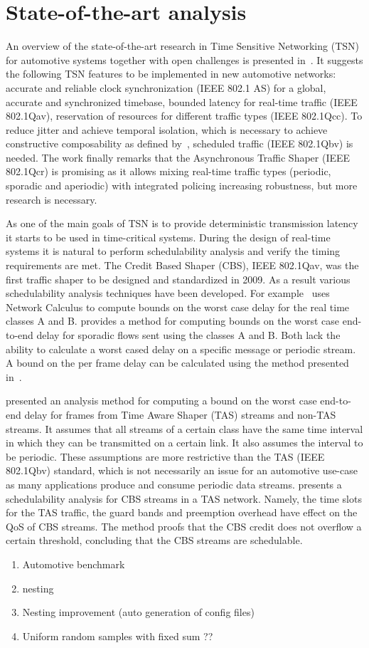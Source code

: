 \section{State-of-the-art analysis}
\label{sec:sota}
An overview of the state-of-the-art research in Time Sensitive Networking (TSN) for automotive systems together with open challenges is presented in~\cite{ashjaei2021time}. It suggests the following TSN features to be implemented in new automotive networks: accurate and reliable clock synchronization (IEEE 802.1 AS) for a global, accurate and synchronized timebase, bounded latency for real-time traffic (IEEE 802.1Qav), reservation of resources for different traffic types (IEEE 802.1Qcc). To reduce jitter and achieve temporal isolation, which is necessary to achieve constructive composability as defined by~\cite{kopetz2003time}, scheduled traffic (IEEE 802.1Qbv) is needed. The work finally remarks that the Asynchronous Traffic Shaper (IEEE 802.1Qcr) is promising as it allows mixing real-time traffic types (periodic, sporadic and aperiodic) with integrated policing increasing robustness, but more research is necessary.

As one of the main goals of TSN is to provide deterministic transmission latency it starts to be used in time-critical systems. During the design of real-time systems it is natural to perform schedulability analysis and verify the timing requirements are met. The Credit Based Shaper (CBS), IEEE 802.1Qav, was the first traffic shaper to be designed and standardized in 2009. As a result various schedulability analysis techniques have been developed. For example~\cite{de2014complete} uses Network Calculus to compute bounds on the worst case delay for the real time classes A and B. \cite{li2017deterministic} provides a method for computing bounds on the worst case end-to-end delay for sporadic flows sent using the classes A and B. Both lack the ability to calculate a worst cased delay on a specific message or periodic stream. A bound on the per frame delay can be calculated using the method presented in~\cite{cao2016independent}. 

\cite{thiele2015formal} presented an analysis method for computing a bound on the worst case end-to-end delay for frames from Time Aware Shaper (TAS) streams and non-TAS streams. It assumes that all streams of a certain class have the same time interval in which they can be transmitted on a certain link. It also assumes the interval to be periodic. These assumptions are more restrictive than the TAS (IEEE 802.1Qbv) standard, which is not necessarily an issue for an automotive use-case as many applications produce and consume periodic data streams. \cite{zhao2018timing} presents a schedulability analysis for CBS streams in a TAS network. Namely, the time slots for the TAS traffic, the guard bands and preemption overhead have effect on the QoS of CBS streams. The method proofs that the CBS credit does not overflow a certain threshold, concluding that the CBS streams are schedulable.

\begin{enumerate}
    \item Automotive benchmark
    \item nesting
    \item Nesting improvement (auto generation of config files)
    \item Uniform random samples with fixed sum ??
\end{enumerate}